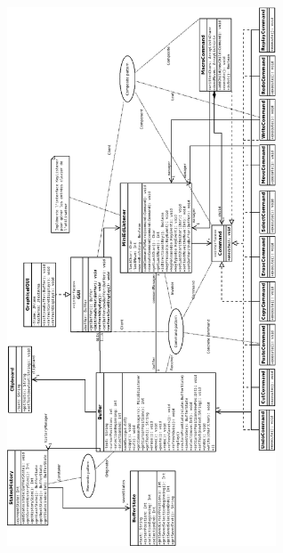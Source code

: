 \documentclass[a4paper, 12pt]{report}
\begin{document}
    \includegraphics[width=0.6\textwidth]{UML.png}~\\[2cm]
    
\end{document}

